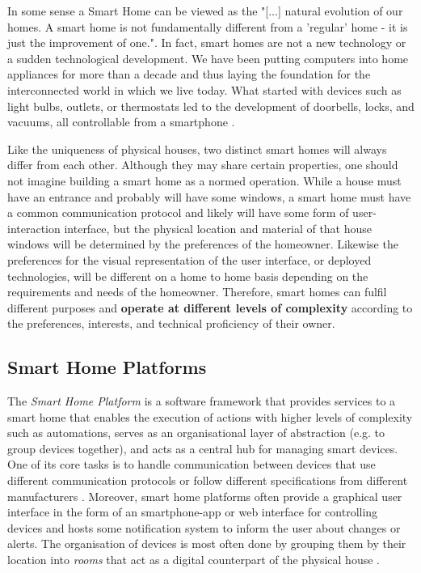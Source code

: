 In some sense a Smart Home can be viewed as the "[...] natural evolution of our homes. A smart home is not fundamentally different from a 'regular' home - it is just the improvement of one."\cite{Tuohy2023SH}. In fact, smart homes are not a new technology or a sudden technological development. We have been putting computers into home appliances for more than a decade \cite{Tuohy2023SH} and thus laying the foundation for the interconnected world in which we live today. What started with devices such as light bulbs, outlets, or thermostats led to the development of doorbells, locks, and vacuums, all controllable from a smartphone \cite{Tuohy2023SH}.

Like the uniqueness of physical houses, two distinct smart homes will always differ from each other. Although they may share certain properties, one should not imagine building a smart home as a normed operation. While a house must have an entrance and probably will have some windows, a smart home must have a common communication protocol and likely will have some form of user-interaction interface, but the physical location and material of that house windows will be determined by the preferences of the homeowner. Likewise the preferences for the visual representation of the user interface, or deployed technologies, will be different on a home to home basis depending on the requirements and needs of the homeowner. Therefore, smart homes can fulfil different purposes and \textbf{ operate at different levels of complexity} according to the preferences, interests, and technical proficiency of their owner.

\subsection{Smart Home Platforms} \label{sec:Smart Home Platforms}
The \textit{Smart Home Platform} is a software framework that provides services to a smart home that enables the execution of actions with higher levels of complexity such as automations, serves as an organisational layer of abstraction (e.g. to group devices together), and acts as a central hub for managing smart devices. One of its core tasks is to handle communication between devices that use different communication protocols \cite{ReviewOfSmartHomes-6177682} or follow different specifications from different manufacturers \cite{Tuohy2023SHP}. Moreover, smart home platforms often provide a graphical user interface in the form of an smartphone-app or web interface for controlling devices and hosts some notification system to inform the user about changes or alerts. The organisation of devices is most often done by grouping them by their location into \textit{rooms} that act as a digital counterpart of the physical house \cite{BertkoChris2017HSH:}.

